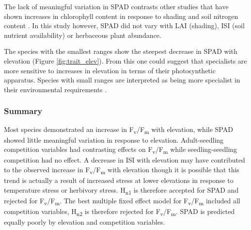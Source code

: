 \documentclass[a4paper,10pt,]{report}
\begin{document}
The lack of meaningful variation in SPAD contrasts other studies that have shown increases in chlorophyll content in response to shading \citep{Brand1997, Rijkers2000, Rozendaal2006, Dai2009, Zervoudakis2012} and soil nitrogen content \citep{Cechin2004}. In this study however, SPAD did not vary with LAI (shading), ISI (soil nutrient availability) or herbaceous plant abundance. 

The species with the smallest ranges show the steepest decrease in SPAD with elevation (Figure \ref{fig:trait_elev}). From this one could suggest that specialists are more sensitive to increases in elevation in terms of their photosynthetic apparatus. Species with small ranges are interpreted as being more specialist in their environmental requirements \citep{Thuiller2005}.

\subsubsection*{Summary}
Most species demonstrated an increase in F\textsubscript{v}/F\textsubscript{m} with elevation, while SPAD showed little meaningful variation in response to elevation. Adult-seedling competition variables had contrasting effects on F\textsubscript{v}/F\textsubscript{m} while seedling-seedling competition had no effect. A decrease in ISI with elevation may have contributed to the observed increase in F\textsubscript{v}/F\textsubscript{m} with elevation though it is possible that this trend is actually a result of increased stress at lower elevations in response to temperature stress or herbivory stress. H\textsubscript{n1} is therefore accepted for SPAD and rejected for F\textsubscript{v}/F\textsubscript{m}. The best multiple fixed effect model for F\textsubscript{v}/F\textsubscript{m} included all competition variables, H\textsubscript{n2} is therefore rejected for F\textsubscript{v}/F\textsubscript{m}. SPAD is predicted equally poorly by elevation and competition variables.
\end{document}
